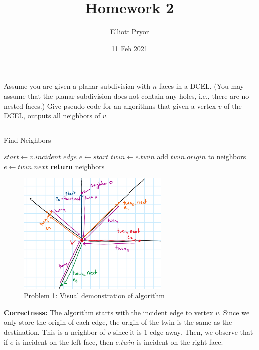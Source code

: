 \documentclass[11pt]{article}
\title{Homework 2}
\author{Elliott Pryor}
\date{11 Feb 2021}
\begin{document}
\maketitle


Assume you are given a planar subdivision with $n$ faces in a DCEL. (You may
assume that the planar subdivision does not contain any holes, i.e., there are
no nested faces.) Give pseudo-code for an algorithms that given a vertex $v$ of
the DCEL, outputs all neighbors of $v$.

\hrule

\begin{algorithm}
    \caption{Find Neighbors}
    \label{alg:neighbors}
    \begin{algorithmic}[1]
        \State $start \gets v.incident\_edge$
        \State $e \gets start$
        \Do
            \State $twin \gets e.twin$
            \State add $twin.origin$ to neighbors
            \State $e \gets twin.next$
        \State \textbf{return} neighbors
    \EndFunction
    \end{algorithmic}
\end{algorithm}


\begin{figure}[h]
    \centering
    \includegraphics[width = 0.65\textwidth]{prob1}
    \caption{Problem 1: Visual demonstration of algorithm}
\end{figure}

\textbf{Correctness:} The algorithm starts with the incident edge to vertex $v$. 
Since we only store the origin of each edge, the origin of the twin is the same as the destination.
This is a neighbor of $v$ since it is 1 edge away. 
Then, we observe that if $e$ is incident on the left face, then $e.twin$ is incident on the right face.
\end{document}

